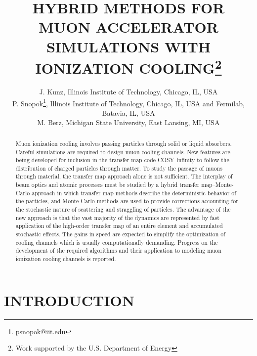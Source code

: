 \documentclass{jacow}
\begin{document}
\title{HYBRID METHODS FOR MUON ACCELERATOR SIMULATIONS WITH IONIZATION COOLING\thanks{Work supported by the U.S. Department of Energy}}

\author{J. Kunz, Illinois Institute of Technology, Chicago, IL, USA \\
P. Snopok\thanks{psnopok@iit.edu}, Illinois Institute of Technology, Chicago, IL, USA and Fermilab, Batavia, IL, USA \\
M. Berz, Michigan State University, East Lansing, MI, USA}

\maketitle

\begin{abstract}
Muon ionization cooling involves passing particles through solid or liquid absorbers. Careful simulations are required to design muon cooling channels. New features are being developed for inclusion in the transfer map code COSY Infinity to follow the distribution of charged particles through matter. To study the passage of muons through material, the transfer map approach alone is not sufficient. The interplay of beam optics and atomic processes must be studied by a hybrid transfer map--Monte-Carlo approach in which transfer map methods describe the deterministic behavior of the particles, and Monte-Carlo methods are used to provide corrections accounting for the stochastic nature of scattering and straggling of particles. The advantage of the new approach is that the vast majority of the dynamics are represented by fast application of the high-order transfer map of an entire element and accumulated stochastic effects. The gains in speed are expected to simplify the optimization of cooling channels which is usually computationally demanding. Progress on the development of the required algorithms and their application to modeling muon ionization cooling channels is reported.
\end{abstract}

\section{INTRODUCTION}

\end{document}

